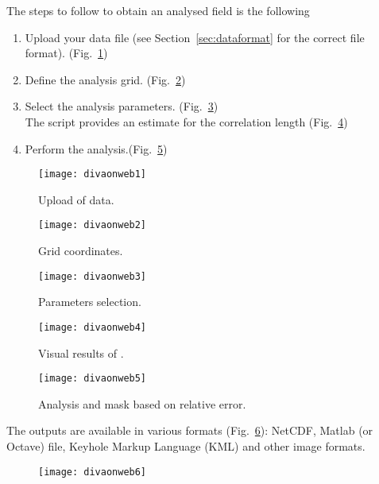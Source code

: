 The steps to follow to obtain an analysed field is the following

\begin{enumerate}
\item Upload your data file (see Section~\ref{sec:dataformat} for the correct file format). \hfill (Fig.~\ref{fig:divaonweb1})
\item Define the analysis grid. \hfill (Fig.~\ref{fig:divaonweb2})
\item Select the analysis parameters. \hfill (Fig.~\ref{fig:divaonweb3})\\
The script  provides an estimate for the correlation length \hfill (Fig.~\ref{fig:divaonweb4})
\item Perform the analysis.\hfill (Fig.~\ref{fig:divaonweb5})
\end{enumerate}

\begin{figure}[H]
\centering 
\texttt{[image: divaonweb1]}
\caption{Upload of data.\label{fig:divaonweb1}}
\end{figure}

\begin{figure}[H]
\centering 
\texttt{[image: divaonweb2]}
\caption{Grid coordinates.\label{fig:divaonweb2}}
\end{figure}

\begin{figure}[H]
\centering 
\texttt{[image: divaonweb3]}
\caption{Parameters selection.\label{fig:divaonweb3}}
\end{figure}

\begin{figure}[H]
\centering 
\texttt{[image: divaonweb4]}
\caption{Visual results of .\label{fig:divaonweb4}}
\end{figure}

\begin{figure}[H]
\centering 
\texttt{[image: divaonweb5]}
\caption{Analysis and mask based on relative error.\label{fig:divaonweb5}}
\end{figure}

The outputs are available in various formats (Fig.~\ref{fig:divaonweb6}): NetCDF, Matlab (or Octave) file, Keyhole Markup Language (KML) and other image formats. 

\begin{figure}[H]
\centering 
\texttt{[image: divaonweb6]}
\caption{\label{fig:divaonweb6}}
\end{figure}


